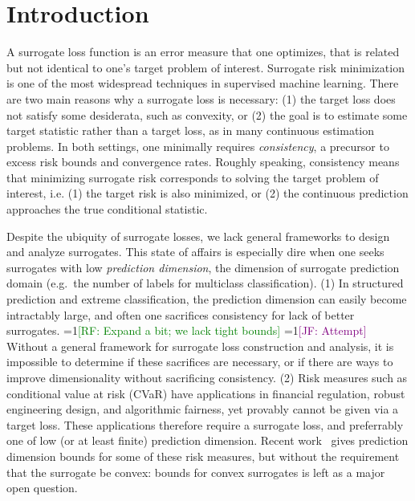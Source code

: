 \documentclass[anon,12pt]{colt2021} %
\newcommand{\Comments}{1}
\newcommand{\mynote}[2]{\ifnum\Comments=1\textcolor{#1}{#2}\fi}
\newcommand{\mytodo}[2]{\ifnum\Comments=1%
	\todo[linecolor=#1!80!black,backgroundcolor=#1,bordercolor=#1!80!black]{#2}\fi}
\newcommand{\raf}[1]{\mynote{green}{[RF: #1]}}
\newcommand{\raft}[1]{\mytodo{green!20!white}{RF: #1}}
\newcommand{\jessie}[1]{\mynote{purple}{[JF: #1]}}
\begin{document}
\section{Introduction}\label{sec:intro}
A surrogate loss function is an error measure that one optimizes, that is related but not identical to one's target problem of interest.
Surrogate risk minimization is one of the most widespread techniques in supervised machine learning.
There are two main reasons why a surrogate loss is necessary: (1) the target loss does not satisfy some desiderata, such as convexity, or (2) the goal is to estimate some target statistic rather than a target loss, as in many continuous estimation problems.
In both settings, one minimally requires \emph{consistency}, a precursor to excess risk bounds and convergence rates.
Roughly speaking, consistency means that minimizing surrogate risk corresponds to solving the target problem of interest, i.e. (1) the target risk is also minimized, or (2) the continuous prediction approaches the true conditional statistic.

Despite the ubiquity of surrogate losses, we lack general frameworks to design and analyze surrogates.
This state of affairs is especially dire when one seeks surrogates with low \emph{prediction dimension}, the dimension of surrogate prediction domain (e.g.\ the number of labels for multiclass classification).
(1) In structured prediction and extreme classification, the prediction dimension can easily become intractably large, and often one sacrifices consistency for lack of better surrogates.
\raf{Expand a bit; we lack tight bounds}
\jessie{Attempt}
Without a general framework for surrogate loss construction and analysis, it is impossible to determine if these sacrifices are necessary, or if there are ways to improve dimensionality without sacrificing consistency.
(2) Risk measures such as conditional value at risk (CVaR) have applications in financial regulation, robust engineering design, and algorithmic fairness, yet provably cannot be given via a target loss.
These applications therefore require a surrogate loss, and preferrably one of low (or at least finite) prediction dimension.
Recent work~\citep{fissler2016higher,frongillo2020elicitation} gives prediction dimension bounds for some of these risk measures, but without the requirement that the surrogate be convex: bounds for convex surrogates is left as a major open question.
\end{document}
